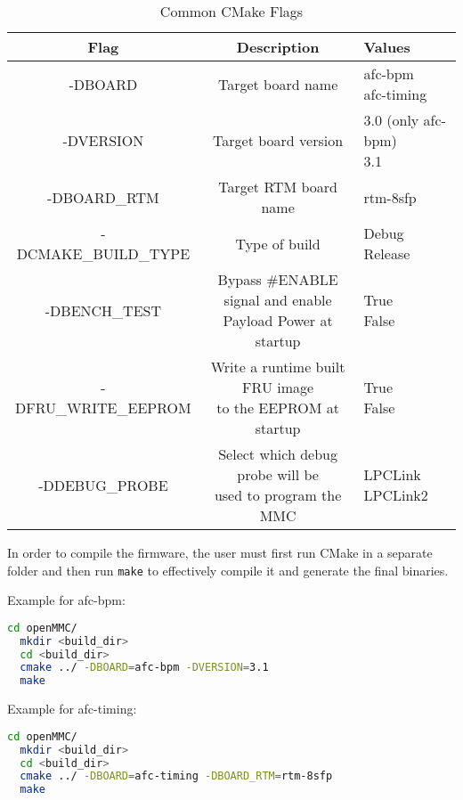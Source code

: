 \documentclass[letterpaper,12pt, titlepage]{article}
\begin{document}
\begin{table}[ht]
  \begin{center}
    \caption{Common CMake Flags}
    \label{tbl:cmake-flags} %
    \begin{tabular}{|c|c|l|}
      \hline
      \textbf{Flag} & \textbf{Description} & \textbf{Values}\\
      \hline
      -DBOARD & Target board name & \makecell[l]{afc-bpm\\afc-timing}\\
      \hline
      -DVERSION & Target board version & \makecell[l]{3.0 (only afc-bpm)\\3.1}\\
      \hline
      -DBOARD\_RTM & Target RTM board name & rtm-8sfp\\
      \hline
      -DCMAKE\_BUILD\_TYPE & Type of build & \makecell[l]{Debug\\Release}\\
      \hline
      -DBENCH\_TEST & \makecell{Bypass \#ENABLE signal and enable\\Payload Power at startup} & \makecell[l]{True\\False}\\
      \hline
      -DFRU\_WRITE\_EEPROM & \makecell{Write a runtime built FRU image\\ to the EEPROM at startup} & \makecell[l]{True\\False}\\
      \hline
      -DDEBUG\_PROBE & \makecell{Select which debug probe will be \\ used to program the MMC} & \makecell[l]{LPCLink\\LPCLink2}\\
      \hline
    \end{tabular}
  \end{center}
\end{table}

In order to compile the firmware, the user must first run CMake in a separate folder and then run \texttt{make} to effectively compile it and generate the final binaries.

Example for afc-bpm:
\begin{lstlisting}[language=bash]
  cd openMMC/
  mkdir <build_dir>
  cd <build_dir>
  cmake ../ -DBOARD=afc-bpm -DVERSION=3.1
  make
\end{lstlisting}

Example for afc-timing:
\begin{lstlisting}[language=bash]
  cd openMMC/
  mkdir <build_dir>
  cd <build_dir>
  cmake ../ -DBOARD=afc-timing -DBOARD_RTM=rtm-8sfp
  make
\end{lstlisting}
\end{document}
